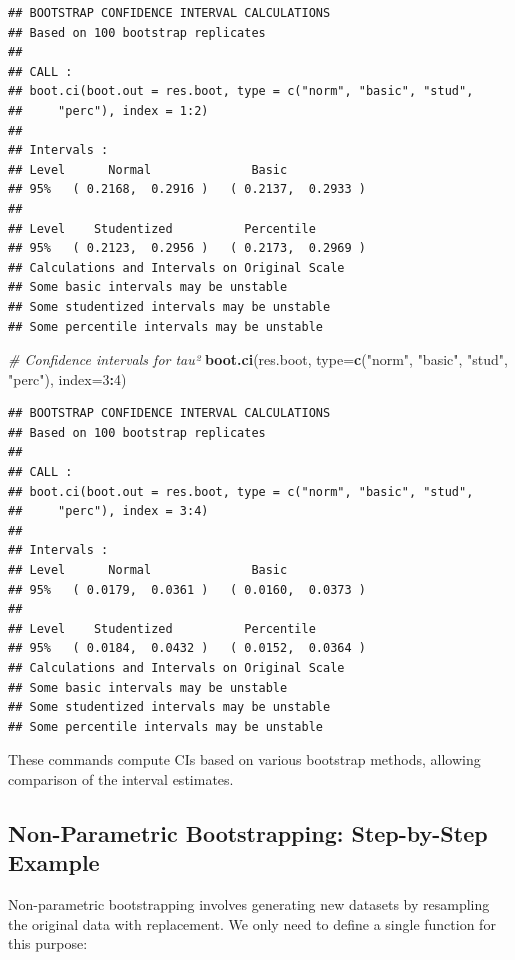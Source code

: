 \documentclass[
]{book}
\newenvironment{Shaded}{\begin{snugshade}}{\end{snugshade}}
\newcommand{\AttributeTok}[1]{\textcolor[rgb]{0.13,0.29,0.53}{#1}}
\newcommand{\CommentTok}[1]{\textcolor[rgb]{0.56,0.35,0.01}{\textit{#1}}}
\newcommand{\DecValTok}[1]{\textcolor[rgb]{0.00,0.00,0.81}{#1}}
\newcommand{\FunctionTok}[1]{\textcolor[rgb]{0.13,0.29,0.53}{\textbf{#1}}}
\newcommand{\NormalTok}[1]{#1}
\newcommand{\SpecialCharTok}[1]{\textcolor[rgb]{0.81,0.36,0.00}{\textbf{#1}}}
\newcommand{\StringTok}[1]{\textcolor[rgb]{0.31,0.60,0.02}{#1}}
\begin{document}
\begin{verbatim}
## BOOTSTRAP CONFIDENCE INTERVAL CALCULATIONS
## Based on 100 bootstrap replicates
## 
## CALL : 
## boot.ci(boot.out = res.boot, type = c("norm", "basic", "stud", 
##     "perc"), index = 1:2)
## 
## Intervals : 
## Level      Normal              Basic         
## 95%   ( 0.2168,  0.2916 )   ( 0.2137,  0.2933 )  
## 
## Level    Studentized          Percentile     
## 95%   ( 0.2123,  0.2956 )   ( 0.2173,  0.2969 )  
## Calculations and Intervals on Original Scale
## Some basic intervals may be unstable
## Some studentized intervals may be unstable
## Some percentile intervals may be unstable
\end{verbatim}

\begin{Shaded}
\begin{Highlighting}[]
\CommentTok{\# Confidence intervals for tau²}
\FunctionTok{boot.ci}\NormalTok{(res.boot, }\AttributeTok{type=}\FunctionTok{c}\NormalTok{(}\StringTok{"norm"}\NormalTok{, }\StringTok{"basic"}\NormalTok{, }\StringTok{"stud"}\NormalTok{, }\StringTok{"perc"}\NormalTok{), }\AttributeTok{index=}\DecValTok{3}\SpecialCharTok{:}\DecValTok{4}\NormalTok{)}
\end{Highlighting}
\end{Shaded}

\begin{verbatim}
## BOOTSTRAP CONFIDENCE INTERVAL CALCULATIONS
## Based on 100 bootstrap replicates
## 
## CALL : 
## boot.ci(boot.out = res.boot, type = c("norm", "basic", "stud", 
##     "perc"), index = 3:4)
## 
## Intervals : 
## Level      Normal              Basic         
## 95%   ( 0.0179,  0.0361 )   ( 0.0160,  0.0373 )  
## 
## Level    Studentized          Percentile     
## 95%   ( 0.0184,  0.0432 )   ( 0.0152,  0.0364 )  
## Calculations and Intervals on Original Scale
## Some basic intervals may be unstable
## Some studentized intervals may be unstable
## Some percentile intervals may be unstable
\end{verbatim}

These commands compute CIs based on various bootstrap methods, allowing comparison of the interval estimates.

\subsection{Non-Parametric Bootstrapping: Step-by-Step Example}\label{non-parametric-bootstrapping-step-by-step-example}

Non-parametric bootstrapping involves generating new datasets by resampling the original data with replacement. We only need to define a single function for this purpose:
\end{document}
